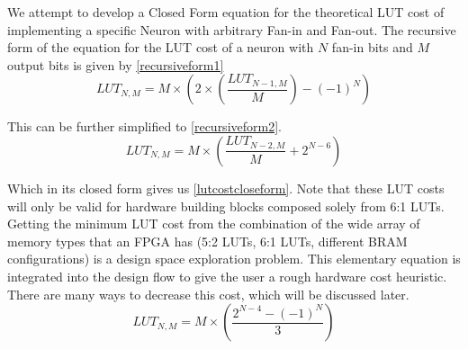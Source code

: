 
We attempt to develop a Closed Form equation for the theoretical LUT cost of implementing a specific Neuron with arbitrary Fan-in and Fan-out.
The recursive form of the equation for the LUT cost of a neuron with $N$ fan-in bits and $M$ output bits is given by \eqref{recursiveform1}
\begin{equation}
    LUT_{N, M} = M\times(2\times(\frac{LUT_{N-1, M}}{M}) - (-1)^{N})
    \label{recursiveform1}
\end{equation}

This can be further simplified to \eqref{recursiveform2}. 
\begin{equation}
    LUT_{N, M} = M\times(\frac{LUT_{N-2, M}}{M} + 2^{N-6})
    \label{recursiveform2}
\end{equation}

Which in its closed form gives us \eqref{lutcostcloseform}. Note that these LUT costs will only be valid for hardware building blocks composed solely from 6:1 LUTs. Getting the minimum LUT cost from the combination of the wide array of memory types that an FPGA has (5:2 LUTs, 6:1 LUTs, different BRAM configurations) is a design space exploration problem. This elementary equation is integrated into the design flow to give the user a rough hardware cost heuristic. There are many ways to decrease this cost, which will be discussed later.
\begin{equation}
    LUT_{N, M} = M\times(\frac{2^{N-4} - (-1)^{N}}{3})
    \label{lutcostcloseform}
\end{equation}




